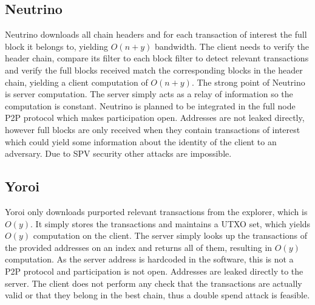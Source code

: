 \subsection{Neutrino}
Neutrino downloads all chain headers and for each transaction of interest the full block it belongs to, yielding $O(n+y)$ bandwidth. The client needs to verify the header chain, compare its filter to each block filter to detect relevant transactions and verify the full blocks received match the corresponding blocks in the header chain, yielding a client computation of $O(n+y)$. The strong point of Neutrino is server computation. The server simply acts as a relay of information so the computation is constant. Neutrino is planned to be integrated in the full node P2P protocol which makes participation open. Addresses are not leaked directly, however full blocks are only received when they contain transactions of interest which could yield some information about the identity of the client to an adversary. Due to SPV security other attacks are impossible.

\subsection{Yoroi}
Yoroi only downloads purported relevant transactions from the explorer, which is $O(y)$. It simply stores the transactions and maintains a UTXO set, which yields $O(y)$ computation on the client. The server simply looks up the transactions of the provided addresses on an index and returns all of them, resulting in $O(y)$ computation. As the server address is hardcoded in the software, this is not a P2P protocol and participation is not open. Addresses are leaked directly to the server. The client does not perform any check that the transactions are actually valid or that they belong in the best chain, thus a double spend attack is feasible.
